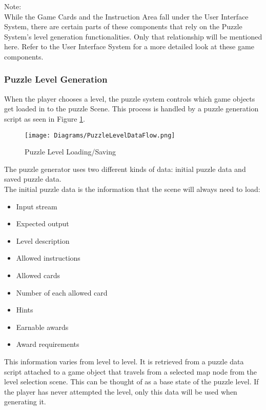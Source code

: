 Note:\\
While the Game Cards and the Instruction Area fall under the User
Interface System, there are certain parts of these components that rely on
the Puzzle System’s level generation functionalities. Only that relationship
will be mentioned here. Refer to the User Interface System for a more detailed
look at these game components.
\clearpage

\subsubsection{Puzzle Level Generation}
When the player chooses a level, the puzzle system controls
which game objects get loaded in to the puzzle Scene. This process is handled
by a puzzle generation script as seen in Figure \ref{fig:puzzle_level_data_flow}.\\

\begin{figure}[!hb]
  \caption{Puzzle Level Loading/Saving}
  \label{fig:puzzle_level_data_flow}
  \centering
  \texttt{[image: Diagrams/PuzzleLevelDataFlow.png]}
\end{figure}
\vfill
\clearpage

The puzzle generator uses two different kinds of data: initial puzzle data and saved puzzle data.\\

The initial puzzle data is the information that the scene will always need to load:
\begin{itemize}
  \item Input stream
  \item Expected output
  \item Level description
  \item Allowed instructions
  \item Allowed cards
  \item Number of each allowed card
  \item Hints
  \item Earnable awards
  \item Award requirements
\end{itemize}

This information varies from level to level. It is retrieved from a puzzle data script attached to
a game object that travels from a selected map node from the level selection scene. This can be
thought of as a base state of the puzzle level. If the player has never attempted the level, only
this data will be used when generating it.\\

